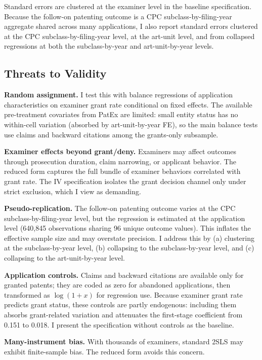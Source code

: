 \documentclass[12pt]{article}
\begin{document}
Standard errors are clustered at the examiner level in the baseline specification. Because the follow-on patenting outcome is a CPC subclass-by-filing-year aggregate shared across many applications, I also report standard errors clustered at the CPC subclass-by-filing-year level, at the art-unit level, and from collapsed regressions at both the subclass-by-year and art-unit-by-year levels.

\subsection{Threats to Validity}

\textbf{Random assignment.} I test this with balance regressions of application characteristics on examiner grant rate conditional on fixed effects. The available pre-treatment covariates from PatEx are limited: small entity status has no within-cell variation (absorbed by art-unit-by-year FE), so the main balance tests use claims and backward citations among the grants-only subsample.

\textbf{Examiner effects beyond grant/deny.} Examiners may affect outcomes through prosecution duration, claim narrowing, or applicant behavior. The reduced form captures the full bundle of examiner behaviors correlated with grant rate. The IV specification isolates the grant decision channel only under strict exclusion, which I view as demanding.

\textbf{Pseudo-replication.} The follow-on patenting outcome varies at the CPC subclass-by-filing-year level, but the regression is estimated at the application level (640,845 observations sharing 96 unique outcome values). This inflates the effective sample size and may overstate precision. I address this by (a) clustering at the subclass-by-year level, (b) collapsing to the subclass-by-year level, and (c) collapsing to the art-unit-by-year level.

\textbf{Application controls.} Claims and backward citations are available only for granted patents; they are coded as zero for abandoned applications, then transformed as $\log(1 + x)$ for regression use. Because examiner grant rate predicts grant status, these controls are partly endogenous: including them absorbs grant-related variation and attenuates the first-stage coefficient from 0.151 to 0.018. I present the specification without controls as the baseline.

\textbf{Many-instrument bias.} With thousands of examiners, standard 2SLS may exhibit finite-sample bias. The reduced form avoids this concern.
\end{document}
